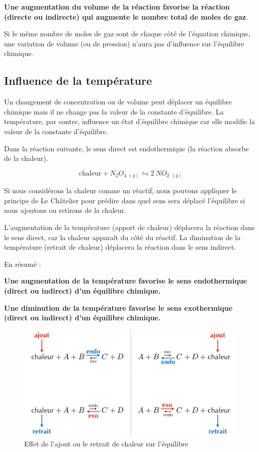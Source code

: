 \documentclass[
  11pt,
  a4paper,
  openany]{book}
\begin{document}
\textbf{Une augmentation du volume de la réaction favorise la réaction (directe ou indirecte) qui augmente le nombre total de moles de gaz}.

Si le même nombre de moles de gaz sont de chaque côté de l'équation chimique, une variation de volume (ou de pression) n'aura pas d'influence sur l'équilibre chimique.

\subsection{Influence de la température}\label{influence-de-la-tempuxe9rature}

Un changement de concentration ou de volume peut déplacer un équilibre chimique mais il ne change pas la valeur de la constante d'équilibre. La température, par contre, influence un état d'équilibre chimique car elle modifie la valeur de la constante d'équilibre.

Dans la réaction suivante, le sens direct est endothermique (la réaction absorbe de la chaleur).

\[
  \text{chaleur} + N_2O_4\ {}_{(g)} \leftrightharpoons 2\ NO_2\ {}_{(g)}
\]

Si nous considérons la chaleur comme un réactif, nous pouvons appliquer le principe de Le Châtelier pour prédire dans quel sens sera déplacé l'équilibre si nous ajoutons ou retirons de la chaleur.

L'augmentation de la température (apport de chaleur) déplacera la réaction dans le sens direct, car la chaleur apparaît du côté du réactif. La diminution de la température (retrait de chaleur) déplacera la réaction dans le sens indirect.

\clearpage

En résumé :

\textbf{Une augmentation de la température favorise le sens endothermique (direct ou indirect) d'un équilibre chimique.}

\textbf{Une diminution de la température favorise le sens exothermique (direct ou indirect) d'un équilibre chimique.}

\begin{figure}

{\centering \includegraphics[width=0.75\linewidth]{images/equilibres-temperature-1} 

}

\caption{Effet de l'ajout ou le retrait de chaleur sur l'équilibre}\label{fig:equilibres-temperature-1}
\end{figure}
\end{document}
